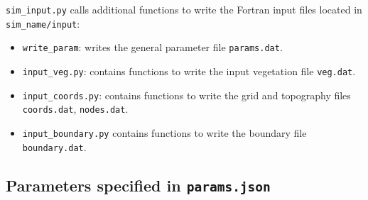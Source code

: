 \documentclass{article}
\newcommand{\code}[1]{\texttt{#1}}
\begin{document}
\code{sim\_input.py} calls additional functions to write the Fortran input files located in \code{sim\_name/input}:
\begin{itemize}
	\item \code{write\_param}: writes the general parameter file  \code{params.dat}.
	\item \code{input\_veg.py}: contains functions to write the input vegetation file \code{veg.dat}.
	\item \code{input\_coords.py}: contains functions to write the  grid and topography files \code{coords.dat}, \code{nodes.dat}. 
	\item \code{input\_boundary.py} contains functions to write the boundary file \code{boundary.dat}.
\end{itemize}


\subsection{Parameters specified in \code{params.json} }
\end{document}
